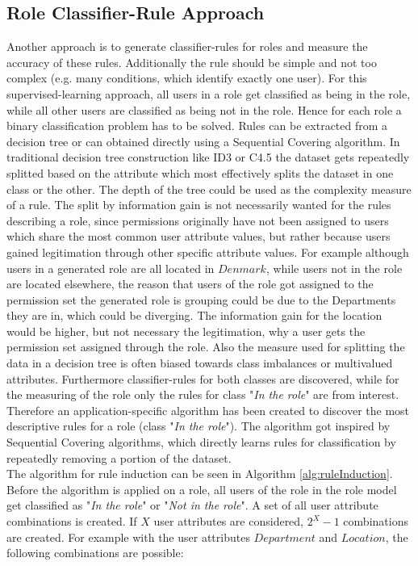         \subsection{Role Classifier-Rule Approach}
        \label{sec:classifierRule}
        Another approach is to generate classifier-rules for roles and measure the accuracy of these rules. Additionally the rule should be simple and not too complex (e.g. many conditions, which identify exactly one user). For this supervised-learning approach, all users in a role get classified as being in the role, while all other users are classified as being not in the role. Hence for each role a binary classification problem has to be solved. Rules can be extracted from a decision tree or can obtained directly using a Sequential Covering algorithm\cite{Han}. In traditional decision tree construction like ID3 or C4.5 the dataset gets repeatedly splitted based on the attribute which most effectively splits the dataset in one class or the other. The depth of the tree could be used as the complexity measure of a rule. The split by information gain is not necessarily wanted for the rules describing a role, since permissions originally have not been assigned to users which share the most common user attribute values, but rather because users gained legitimation through other specific attribute values. For example although users in a generated role are all located in $Denmark$, while users not in the role are located elsewhere, the reason that users of the role got assigned to the permission set the generated role is grouping could be due to the Departments they are in, which could be diverging. The information gain for the location would be higher, but not necessary the legitimation, why a user gets the permission set assigned through the role. Also the measure used for splitting the data in a decision tree is often biased towards class imbalances or multivalued attributes\cite{Han}. Furthermore classifier-rules for both classes are discovered, while for the measuring of the role only the rules for class "\textit{In the role}" are from interest. Therefore an application-specific algorithm has been created to discover the most descriptive rules for a role (class "\textit{In the role}"). The algorithm got inspired by Sequential Covering algorithms, which directly learns rules for classification by repeatedly removing a portion of the dataset.\\
        The algorithm for rule induction can be seen in Algorithm \ref{alg:ruleInduction}. Before the algorithm is applied on a role, all users of the role in the role model get classified as "\textit{In the role}" or "\textit{Not in the role}". A set of all user attribute combinations is created. If $X$ user attributes are considered, $2^X-1$ combinations are created. For example with the user attributes $Department$ and $Location$, the following combinations are possible:\\
